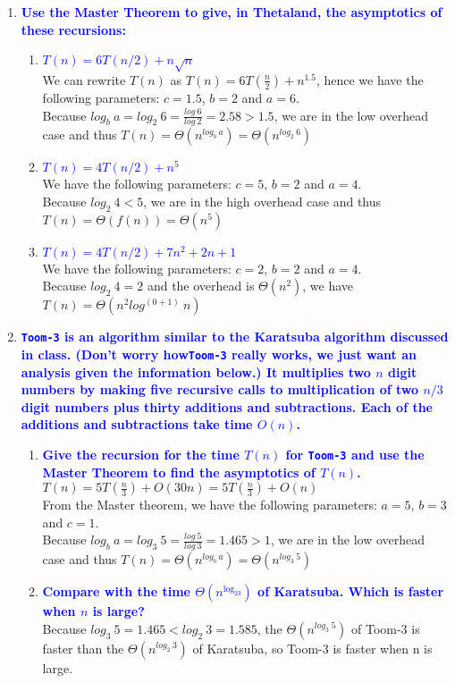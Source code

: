 \documentclass[11pt]{article}
\begin{document}
\begin{enumerate}
\item \textbf{\textcolor{blue}{Use the Master Theorem to give, in Thetaland, the asymptotics of
these recursions:}}
    \begin{enumerate}
    \item \textbf{\textcolor{blue}{$T(n)= 6T(n/2) + n\sqrt{n}$}}
        \\ We can rewrite $T(n)$ as $T(n) = 6T(\frac{n}{2}) + n^{1.5}$, hence we have the following parameters:
        $c = 1.5$, $b = 2$ and $a = 6$.
        \\ Because $log_b\ a = log_2\ 6 = \frac{log\ 6}{log\ 2} = 2.58 > 1.5$, we are in the low overhead case and thus $T(n) = \Theta(n^{log_b\ a}) = \Theta(n^{log_2\ 6})$
    \item \textbf{\textcolor{blue}{$T(n)= 4T(n/2)+n^5$}}
        \\ We have the following parameters: $c = 5$, $b = 2$ and $a = 4$.
        \\ Because $log_2\ 4 < 5$, we are in the high overhead case and thus $T(n) = \Theta(f(n)) = \Theta(n^5)$
    \item \textbf{\textcolor{blue}{$T(n)= 4T(n/2)+7n^2+2n+1$}}
        \\ We have the following parameters: $c = 2$, $b = 2$ and $a = 4$.
        \\ Because $log_2\ 4 = 2$ and the overhead is $\Theta(n^2)$, we have $T(n) = \Theta(n^2log^{(0+1)}\ n)$
    \end{enumerate}

\item  \textbf{\textcolor{blue}{{\tt Toom-3} is an algorithm similar to the Karatsuba algorithm discussed in class. (Don't worry how{\tt Toom-3} really works, we just want an analysis given the
information below.) It multiplies two $n$ digit numbers by making five recursive calls
to multiplication of two $n/3$ digit numbers plus thirty additions and subtractions. Each of the additions and subtractions take time $O(n)$.}}
    \begin{enumerate}
    \item \textbf{\textcolor{blue}{Give the recursion for the time $T(n)$ for {\tt Toom-3} and use the Master Theorem to find the asymptotics of $T(n)$.}}
        \\ $T(n) = 5T(\frac{n}{3}) + O(30n) = 5T(\frac{n}{3}) + O(n)$
        \\ From the Master theorem, we have the following parameters: $a = 5$, $b = 3$ and $c = 1$.
        \\ Because $log_b\ a = log_3\ 5 = \frac{log\ 5}{log\ 3} = 1.465 > 1$, we are in the low overhead case and thus $T(n) = \Theta(n^{log_b\ a}) = \Theta(n^{log_3\ 5})$
    \item \textbf{\textcolor{blue}{Compare with the time $\Theta(n^{\log_23})$ of Karatsuba. Which is faster when $n$ is large?}}
        \\ Because $log_3\ 5 = 1.465 < log_2\ 3 = 1.585$, the $\Theta(n^{log_3\ 5})$ of Toom-3 is faster than the $\Theta(n^{log_2\ 3})$ of Karatsuba, so Toom-3 is faster when n is large.
    \end{enumerate}


\end{enumerate}
\end{document}
